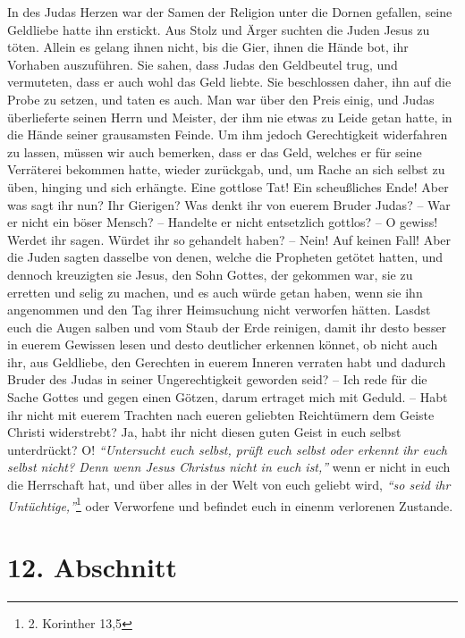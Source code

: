 In des Judas Herzen war der Samen der Religion unter die Dornen gefallen, seine
Geldliebe hatte ihn erstickt. Aus Stolz und Ärger suchten die Juden Jesus zu
töten. Allein es gelang ihnen nicht, bis die Gier, ihnen die Hände bot, ihr
Vorhaben auszuführen. Sie sahen, dass Judas den Geldbeutel trug, und vermuteten, dass
er auch wohl das Geld liebte. Sie beschlossen daher, ihn auf die Probe zu
setzen, und taten es auch. Man war über den Preis einig, und Judas
überlieferte seinen Herrn und Meister, der ihm nie etwas zu Leide getan hatte,
in die Hände seiner grausamsten Feinde. Um ihm jedoch Gerechtigkeit widerfahren
zu lassen, müssen wir auch bemerken, dass er das Geld, welches er für seine
Verräterei bekommen hatte, wieder zurückgab, und, um Rache an sich selbst zu
üben, hinging und sich erhängte. Eine gottlose
Tat! Ein scheußliches Ende! Aber
was sagt ihr nun? Ihr Gierigen? Was denkt ihr von euerem Bruder Judas? -- War er
nicht ein böser Mensch? -- Handelte er nicht entsetzlich gottlos? -- O gewiss!
Werdet ihr sagen. Würdet ihr so gehandelt haben? -- Nein! Auf keinen Fall! Aber
die Juden sagten dasselbe von denen, welche die
Propheten getötet hatten, und
dennoch kreuzigten sie Jesus, den Sohn Gottes, der gekommen war, sie zu
erretten
und selig zu machen, und es auch würde getan haben, wenn sie ihn angenommen und
den Tag ihrer Heimsuchung nicht verworfen hätten. Lasdst euch
die Augen salben und vom Staub der Erde reinigen, damit ihr desto besser in euerem Gewissen
lesen und desto deutlicher erkennen könnet, ob nicht auch ihr, aus Geldliebe,
den Gerechten in euerem Inneren verraten habt und dadurch Bruder des Judas in
seiner Ungerechtigkeit geworden seid? -- Ich rede für die Sache Gottes und gegen
einen Götzen, darum ertraget mich mit Geduld. -- Habt ihr nicht
mit euerem
Trachten nach eueren geliebten Reichtümern dem Geiste Christi widerstrebt? Ja,
habt ihr nicht diesen guten Geist in euch selbst unterdrückt? O!
\textit{"`Untersucht
euch selbst, prüft euch selbst oder erkennt ihr euch selbst nicht? Denn wenn
Jesus Christus nicht in euch ist,"'}
wenn er nicht in euch die Herrschaft hat,
und über alles in der Welt von euch geliebt wird, \textit{"`so seid ihr
Untüchtige,"'}\footnote{2. Korinther 13,5}
oder Verworfene und befindet euch in einenm
verlorenen Zustande.

\section{12. Abschnitt} \label{kap13_ab12}

